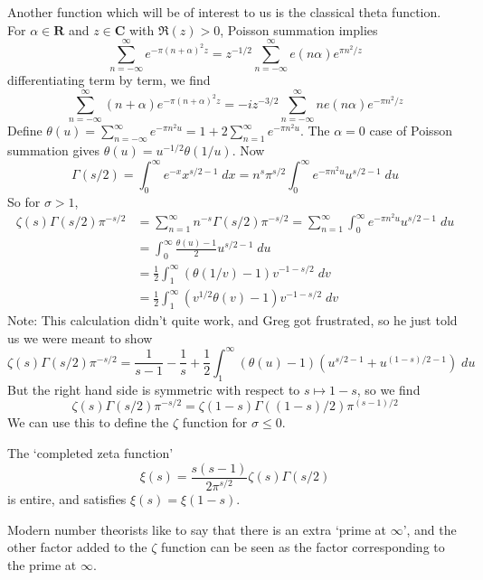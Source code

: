 Another function which will be of interest to us is the classical theta function. For $\alpha \in \mathbf{R}$ and $z \in \mathbf{C}$ with $\Re(z) > 0$, Poisson summation implies
%
\[ \sum_{n = -\infty}^\infty e^{- \pi (n + \alpha)^2 z} = z^{-1/2} \sum_{n = -\infty}^\infty e(n\alpha) e^{\pi n^2/z} \]
%
differentiating term by term, we find
%
\[ \sum_{n = -\infty}^\infty (n + \alpha) e^{- \pi  (n + \alpha)^2 z} = - iz^{-3/2} \sum_{n = -\infty}^\infty n e(n\alpha) e^{- \pi n^2/z} \]
%
Define $\theta(u) = \sum_{n = -\infty}^\infty e^{- \pi n^2 u} = 1 + 2 \sum_{n = 1}^\infty e^{- \pi n^2 u}$. The $\alpha = 0$ case of Poisson summation gives $\theta(u) = u^{-1/2} \theta(1/u)$. Now
%
\[ \Gamma(s/2) = \int_0^\infty e^{-x} x^{s/2 - 1}\; dx = n^s \pi^{s/2} \int_0^\infty e^{- \pi n^2 u} u^{s/2 - 1}\; du \]
%
So for $\sigma > 1$,
%
\begin{align*}
    \zeta(s) \Gamma(s/2) \pi^{-s/2} &= \sum_{n = 1}^\infty n^{-s} \Gamma(s/2) \pi^{-s/2} = \sum_{n = 1}^\infty \int_0^\infty e^{- \pi n^2 u} u^{s/2 - 1}\; du\\
    &= \int_0^\infty \frac{\theta(u) - 1}{2} u^{s/2 - 1}\; du\\
    &= \frac{1}{2} \int_1^\infty (\theta(1/v) - 1) v^{-1-s/2}\; dv\\
    &= \frac{1}{2} \int_1^\infty (v^{1/2} \theta(v) - 1) v^{-1-s/2}\; dv
\end{align*}
%
Note: This calculation didn't quite work, and Greg got frustrated, so he just told us we were meant to show
%
\[ \zeta(s) \Gamma(s/2) \pi^{-s/2} = \frac{1}{s - 1} - \frac{1}{s} + \frac{1}{2} \int_1^\infty (\theta(u) - 1)(u^{s/2 - 1} + u^{(1-s)/2 - 1})\; du \]
%
But the right hand side is symmetric with respect to $s \mapsto 1 - s$, so we find
%
\[ \zeta(s) \Gamma(s/2) \pi^{-s/2} = \zeta(1 - s) \Gamma((1 - s)/2) \pi^{(s-1)/2} \]
%
We can use this to define the $\zeta$ function for $\sigma \leq 0$.

\begin{corollary}
    The `completed zeta function'
    \[ \xi(s) = \frac{s(s-1)}{2 \pi^{s/2}} \zeta(s) \Gamma(s/2) \]
    is entire, and satisfies $\xi(s) = \xi(1-s)$.
\end{corollary}

\begin{remark}
    Modern number theorists like to say that there is an extra `prime at $\infty$', and the other factor added to the $\zeta$ function can be seen as the factor corresponding to the prime at $\infty$.
\end{remark}



